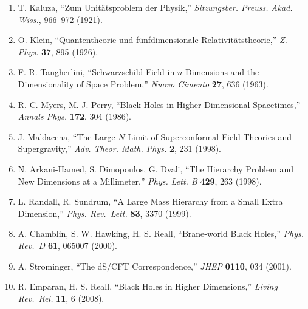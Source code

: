 \documentclass[a4paper,11pt]{article}
\theoremstyle{definition}
\providecommand{\tightlist}{\setlength{\itemsep}{0pt}\setlength{\parskip}{0pt}}
\begin{document}
\begin{enumerate}
\def\labelenumi{\arabic{enumi}.}
\tightlist
\item
  T. Kaluza, ``Zum Unitätsproblem der Physik,'' \emph{Sitzungsber.
  Preuss. Akad. Wiss.}, 966--972 (1921).
\item
  O. Klein, ``Quantentheorie und fünfdimensionale Relativitätstheorie,''
  \emph{Z. Phys.} \textbf{37}, 895 (1926).
\item
  F. R. Tangherlini, ``Schwarzschild Field in \(n\) Dimensions and the
  Dimensionality of Space Problem,'' \emph{Nuovo Cimento} \textbf{27},
  636 (1963).
\item
  R. C. Myers, M. J. Perry, ``Black Holes in Higher Dimensional
  Spacetimes,'' \emph{Annals Phys.} \textbf{172}, 304 (1986).
\item
  J. Maldacena, ``The Large-\(N\) Limit of Superconformal Field Theories
  and Supergravity,'' \emph{Adv. Theor. Math. Phys.} \textbf{2}, 231
  (1998).
\item
  N. Arkani-Hamed, S. Dimopoulos, G. Dvali, ``The Hierarchy Problem and
  New Dimensions at a Millimeter,'' \emph{Phys. Lett. B} \textbf{429},
  263 (1998).
\item
  L. Randall, R. Sundrum, ``A Large Mass Hierarchy from a Small Extra
  Dimension,'' \emph{Phys. Rev.~Lett.} \textbf{83}, 3370 (1999).
\item
  A. Chamblin, S. W. Hawking, H. S. Reall, ``Brane-world Black Holes,''
  \emph{Phys. Rev.~D} \textbf{61}, 065007 (2000).
\item
  A. Strominger, ``The dS/CFT Correspondence,'' \emph{JHEP}
  \textbf{0110}, 034 (2001).
\item
  R. Emparan, H. S. Reall, ``Black Holes in Higher Dimensions,''
  \emph{Living Rev.~Rel.} \textbf{11}, 6 (2008).
\end{enumerate}
\end{document}
